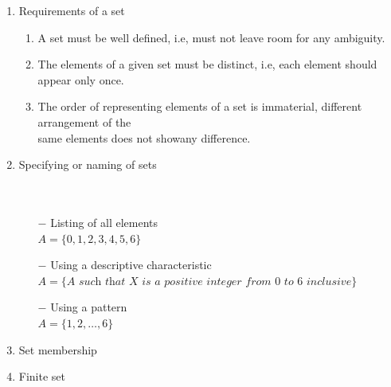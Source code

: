 \documentclass[12pt]{report}
\begin{document}
    \begin{enumerate}
        \item Requirements of a set \\
            \begin{enumerate}
                \item A set must be well defined, i.e, must not leave room for any ambiguity.
                \item The elements of a given set must be distinct, i.e, each element should appear only once.
                \item The order of representing elements of a set is immaterial, different arrangement of the \\
                same elements does not showany difference.
            \end{enumerate}
        \item Specifying or naming of sets \\
             \\
             \\
            \begin{itemize}
                \item[$-$] Listing of all elements \\
                $ A = \{0,1,2,3,4,5,6\}$
                \item[$-$] Using a descriptive characteristic \\
                $ A = \{\textit{A such that X is a positive integer from 0 to 6 inclusive} \} $
                \item[$-$] Using a pattern \\
                $ A = \{1,2,\ldots,6\}$
            \end{itemize}
        \item Set membership \\
        \item Finite set \\

\end{enumerate}
\end{document}
